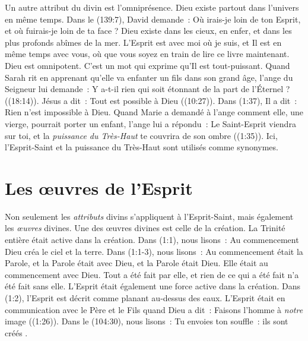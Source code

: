 Un autre attribut du divin est l'omniprésence. Dieu existe partout dans
 l'univers en même temps. Dans le (139:7), David demande~:
 \og Où irais-je loin de ton Esprit, et où fuirais-je loin de ta face ? \fg{}
 Dieu existe dans les cieux, en enfer, et dans les plus profonds abîmes de
 la mer. L'Esprit est avec moi où je suis, et Il est en même temps avec vous,
 où que vous soyez en train de lire ce livre maintenant. Dieu est omnipotent.
 C'est un mot qui exprime qu'Il est tout-puissant. Quand Sarah rit en apprenant
 qu'elle va enfanter un fils dans son grand âge, l'ange du Seigneur lui demande~:
 \og Y a-t-il rien qui soit étonnant de la part de l'Éternel ? \fg{}
 ((18:14)). Jésus a dit~: \og Tout est possible à Dieu \fg{}
 ((10:27)). Dans (1:37), Il a dit~:
 \og Rien n'est impossible à Dieu. \fg{} Quand Marie a demandé à l'ange comment
 elle, une vierge, pourrait porter un enfant, l'ange lui a répondu~:
 \og Le Saint-Esprit viendra sur toi, et la \emph{puissance du Très-Haut} te couvrira
 de son ombre \fg{} ((1:35)). Ici, l'Esprit-Saint et
 la puissance du Très-Haut sont utilisés comme synonymes.

\section{Les \oe{}uvres de l'Esprit}


Non seulement les \emph{attributs} divins s'appliquent à l'Esprit-Saint, mais
 également les \emph{œuvres} divines.
 Une des œuvres divines est celle de la création.
 La Trinité entière était active dans la création.
 Dans (1:1), nous lisons~:
 \og Au commencement Dieu créa le ciel et la terre. \fg{}
 Dans (1:1-3), nous lisons~:
 \og Au commencement était la Parole, et la Parole était avec Dieu,
 et la Parole était Dieu. Elle était au commencement avec Dieu.
 Tout a été fait par elle, et rien de ce qui a été fait n'a été fait
 sans elle. \fg{}
 L'Esprit était également une force active dans la création.
 Dans (1:2), l'Esprit est décrit comme planant au-dessus
 des eaux. L'Esprit était en communication avec le Père et le Fils quand
 Dieu a dit~: \og Faisons l'homme à \emph{notre} image \fg{} ((1:26)).
 Dans le (104:30), nous lisons~:
 \og Tu envoies ton souffle~: ils sont créés \fg{}
 .

